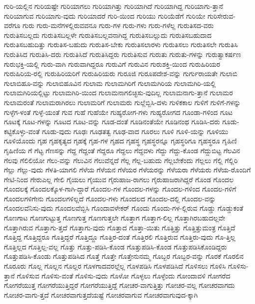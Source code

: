 {ಗುರಿ-ಯಲ್ಲಿನ
ಗುರಿಯಷ್ಟೇ
ಗುರಿಯಾಗಲು
ಗುರಿಯಾಗಿತ್ತು
ಗುರಿಯಾಗಿದೆ
ಗುರಿಯಾಗಿದ್ದ
ಗುರಿಯಾಗು-ತ್ತಾನೆ
ಗುರಿಯಾಗುವ
ಗುರಿಯಾಗು-ವುದು
ಗುರಿಯಾದರೆ
ಗುರಿ-ಯಿಂದ
ಗುರಿಯು
ಗುರಿಯೆಡೆಗೆ
ಗುರಿಯೇ
ಗುರಿಸೇರುವ-ವರೆಗೂ
ಗುರು
ಗುರು-ಮನೆಗಳಲ್ಲಿರುವವನೂ
ಗುರು-ಗಳ
ಗುರು-ಗಳು
ಗುರು-ಗಳೆಲ್ಲ
ಗುರುತಿಸದ-ವರು
ಗುರುತಿಸಬಲ್ಲದು
ಗುರುತಿಸಬಲ್ಲಳೇ
ಗುರುತಿಸಬಲ್ಲವನಾಗಿದ್ದ
ಗುರುತಿಸಬಲ್ಲುದು
ಗುರುತಿಸಬಹುದಾದ
ಗುರುತಿಸಬಹುದಿತ್ತು
ಗುರುತಿಸ-ಬಹುದು
ಗುರುತಿಸ-ಬೇಕು
ಗುರುತಿಸಲಾರಳು
ಗುರುತಿಸಲು
ಗುರುತಿಸಲೇ
ಗುರುತಿಸಿ
ಗುರುತಿಸಿದ
ಗುರುತಿಸಿ-ದರು
ಗುರುತಿಸಿದೆ
ಗುರುತಿಸಿದ್ದರು
ಗುರುತಿಸುವ
ಗುರುತು
ಗುರುತು-ಗಳನ್ನು
ಗುರುತ್ವಾಕರ್ಷಣ
ಗುರುಭಕ್ತಿ-ಯಲ್ಲಿ
ಗುರು-ವಾಗಿ
ಗುರುವಾಗಿದ್ದರೂ
ಗುರುವಿಗೆ
ಗುರುವಿನ
ಗುರುಶಕ್ತಿ-ಯಿಂದ
ಗುರುಹಿರಿಯರ
ಗುರುಹಿರಿಯ-ರಲ್ಲಿ
ಗುರುಹಿರಿಯರಿಗೆ
ಗುರುಹಿರಿಯರು
ಗುರೂಜಿ
ಗುರೂಪದೇಶ-ವನ್ನು
ಗುರ್ಗುರಾಯತೇ
ಗುಲಾಬಿ
ಗುಲಾಬಿಹೂ-ವನ್ನು
ಗುಲಾಬಿಹೂವಿನ
ಗುಲಾಮ
ಗುಲಾಮಗಿರಿಗೆ
ಗುಲಾಮಗಿರಿಯ
ಗುಲಾಮಗಿರಿ-ಯಲ್ಲಿ
ಗುಲಾಮಗಿರಿಯಲ್ಲಿಟ್ಟು
ಗುಲಾಮಗಿರಿ-ಯಿಂದ
ಗುಲಾಮನಾಗಲಿಚ್ಛಿಸು-ವುದಿಲ್ಲ
ಗುಲಾಮನಾಗು-ತ್ತಾನೆ
ಗುಲಾಮರ
ಗುಲಾಮರಂತೆ
ಗುಲಾಮರಾಗಿರಲು
ಗುಲಾಮರಿಗೆ
ಗುಲಾಮರು
ಗುಲ್ಲೆಬ್ಬಿಸಿ-ದಳು
ಗುಳಿಕಕಾಲ
ಗುಳಿಗೆ
ಗುಳಿಗೆ-ಗಳನ್ನು
ಗುಳ್ಳೆಗ-ಳಂತೆ
ಗುಳ್ಳೆ-ಯಂತೆ
ಗುವ
ಗುಹೆ
ಗುಹೆಯೇ
ಗುಹ್ಯರೋಗ-ಗಳು
ಗುಹ್ಯರೋಗದ
ಗೂಂಡಾ-ಗಳಿಂದ
ಗೂಟ
ಗೂಟಕ್ಕೆ
ಗೂಟ-ಗಳನ್ನು
ಗೂಟದ
ಗೂಟ-ವನ್ನು
ಗೂಡ-ದಂತೆ
ಗೂಡಿನಂತೆಯೇ
ಗೂಡಿನಂಥ
ಗೂಡಿಸಿ-ದರು
ಗೂಡು-ಕಟ್ಟಿಕೊಳ್ಳು-ವಂತೆ
ಗೂಡು-ವುದು
ಗೂಢಃ
ಗೂಢತತ್ವ
ಗೂಢ-ವಾದ
ಗೂರಲು
ಗೂಳಿ
ಗೂಳಿ-ಯನ್ನು
ಗೂಳಿಯು
ಗೂಳಿಯೊಂದು
ಗೃಹ
ಗೃಹಕೃತ್ಯದ
ಗೃಹಕ್ಕೆ
ಗೃಹ-ಗಳ
ಗೃಹದ
ಗೃಹಸ್ಥ
ಗೃಹಸ್ಥರನ್ನೂ
ಗೃಹಸ್ಥರಿಗೂ
ಗೃಹಸ್ಥರೂ
ಗೃಹಿಣಿ
ಗೃಹಿಣಿಯ
ಗೆ
ಗೆಟ್ಟ
ಗೆಣಸನ್ನು
ಗೆದ್ದ
ಗೆದ್ದಂತೆ
ಗೆದ್ದರೂ
ಗೆದ್ದಲು
ಗೆದ್ದವಳು
ಗೆದ್ದು
ಗೆದ್ದು-ಕೊಂಡ
ಗೆದ್ದುಬಿಟ್ಟ
ಗೆಲವಿನ
ಗೆಲವು
ಗೆಲಿಲಿಯೋ
ಗೆಲು-ವನ್ನು
ಗೆಲುವಿನ
ಗೆಲುವೆನ್ನದೆ
ಗೆಲ್ಲ
ಗೆಲ್ಲ-ಬಹುದು
ಗೆಲ್ಲಬೇಕೆಂದು
ಗೆಲ್ಲಲು
ಗೆಲ್ಲಿ
ಗೆಲ್ಲಿರಿ
ಗೆಲ್ಲು
ಗೆಲ್ಲು-ವುದು
ಗೆಳತಿ-ಯಾಗಲಿ
ಗೆಳೆಯ
ಗೆಳೆಯನ
ಗೆಳೆಯರ
ಗೆಳೆಯರನ್ನು
ಗೆಳೆಯರಾ
ಗೆಳೆಯರು
ಗೆಳೆಯ-ರೊಂದಿಗೆ
ಗೇಟಿ-ನಿಂದ
ಗೇರುಎಲ್ಲ
ಗೇಲಿ
ಗೈಯಲು
ಗೈಯುವ
ಗೈರುಹಾಜ-ರಾಗಲು
ಗೈರುಹಾಜರಾಗಿದ್ದರೆ
ಗೊಂಡ
ಗೊಂದಲ
ಗೊಂದಲಕ್ಕೆ
ಗೊಂದಲಕ್ಕೊಳ-ಗಾಗಿ-ದ್ದಾರೆ
ಗೊಂದಲ-ಗಳ
ಗೊಂದಲ-ಗಳನ್ನು
ಗೊಂದಲ-ಗಳಿಂದ
ಗೊಂದಲ-ಗಳಿಗೆ
ಗೊಂದಲಗಳಿಗೇನು
ಗೊಂದಲಗಳಿಲ್ಲದೆ
ಗೊಂದಲ-ಗಳು
ಗೊಂದಲದ
ಗೊಂದಲ-ದಲ್ಲಿ
ಗೊಂದಲ-ವನ್ನು
ಗೊಂದಲವೆನಿಸು-ವುದು
ಗೊಂದಲವೆಬ್ಬಿಸಿ
ಗೊಂದಾವಳೇಕರ್
ಗೊಂದು
ಗೊಂದು-ಗಳ-ಲ್ಲಿರುವ
ಗೊಡ್ಡು
ಗೊಡ್ಡುಕಂತೆ
ಗೊಣಗಾಟ
ಗೊಣಗುಟ್ಟುತ್ತ
ಗೊಣಗುತ್ತ
ಗೊಣಗುತ್ತಲೇ
ಗೊತ್ತಾಗ
ಗೊತ್ತಾಗ-ಲಿಲ್ಲ
ಗೊತ್ತಾಗಿರಬಹುದಲ್ಲವೇ
ಗೊತ್ತಾಗಿರುವ
ಗೊತ್ತಾಗು-ತ್ತದೆ
ಗೊತ್ತಾಗು-ವುದು
ಗೊತ್ತಾದ
ಗೊತ್ತಾ-ಯಿತು
ಗೊತ್ತಿತ್ತು
ಗೊತ್ತಿತ್ತುಮಂತ್ರ
ಗೊತ್ತಿದೆ
ಗೊತ್ತಿದ್ದ
ಗೊತ್ತಿದ್ದರೂ
ಗೊತ್ತಿದ್ದರೆ
ಗೊತ್ತಿದ್ದೂ
ಗೊತ್ತಿರ-ದಂತೆ
ಗೊತ್ತಿರಲಿ
ಗೊತ್ತಿರುವ
ಗೊತ್ತಿರು-ವುದು
ಗೊ-ತ್ತಿಲ್ಲ
ಗೊತ್ತಿಲ್ಲದ
ಗೊತ್ತಿಲ್ಲ-ವಲ್ಲ
ಗೊತ್ತು
ಗೊತ್ತು-ಪಡಿಸಿ-ಕೊಂಡ
ಗೊತ್ತುಪಡಿಸಿ-ಕೊಂಡ
ಗೊತ್ತುಪಡಿಸಿಕೊಂಡಿದ್ದರು
ಗೊತ್ತುಪಡಿಸಿ-ಕೊಂಡು
ಗೊತ್ತುಪಡಿಸಿದ
ಗೊತ್ತೆ
ಗೊತ್ತೇ
ಗೊತ್ತೇನುನಮ್ಮ
ಗೊಬ್ಬರ
ಗೊಬ್ಬರ-ವನ್ನು
ಗೊರಕೆ
ಗೊರಲಿನ
ಗೊರೂರು
ಗೊಲ್ಲ
ಗೊಲ್ಲನ
ಗೊಲ್ಲರ
ಗೊಳಗಾದವರಲ್ಲೆಲ್ಲ
ಗೊಳಪಡಿಸಿ
ಗೊಳಪಡಿಸಿದೆ
ಗೊಳಿಸಲು
ಗೊಳಿಸಿ
ಗೊಳಿಸು-ತ್ತಾನೆ
ಗೊಳಿಸುವ
ಗೊಳಿಸು-ವಂತೆ
ಗೊಳಿಸು-ವುದು
ಗೊಳೋ
ಗೊಳ್ಳಲು
ಗೊಳ್ಳೆಂದು
ಗೋಂದಾವಳಿ
ಗೋಗರೆದ
ಗೋಗರೆಯುತ್ತ
ಗೋಗರೆಯುತ್ತಿದ್ದರೆ
ಗೋಗರೆಯುತ್ತಿದ್ದೆ
ಗೋಚರ-ವಾಗುತ್ತಿತ್ತು
ಗೋಚರ-ವಲ್ಲ
ಗೋಚರವಾಗದು
ಗೋಚರ-ವಾಗು-ತ್ತದೆ
ಗೋಚರವಾಗುತ್ತದೆಯಷ್ಟೆ
ಗೋಚರವಾಗುವ
ಗೋಚರವಾಗುವುದ-ಕ್ಕಾಗಿ
}
